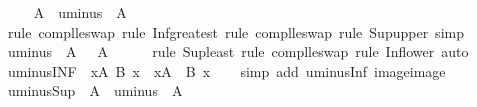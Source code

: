 \begin{isabellebody}
\ \ \isamarkupfalse%
\ {\isachardoublequoteopen}{\isacharminus}{\kern0pt}\ {\isasymSqinter}A\ {\isasymle}\ {\isasymSqunion}{\isacharparenleft}{\kern0pt}uminus\ {\isacharbackquote}{\kern0pt}\ A{\isacharparenright}{\kern0pt}{\isachardoublequoteclose}\isanewline
\ \ \ \ \isamarkupfalse%
\ {\isacharparenleft}{\kern0pt}rule\ compl{\isacharunderscore}{\kern0pt}le{\isacharunderscore}{\kern0pt}swap{}{\isacharcomma}{\kern0pt}\ rule\ Inf{\isacharunderscore}{\kern0pt}greatest{\isacharcomma}{\kern0pt}\ rule\ compl{\isacharunderscore}{\kern0pt}le{\isacharunderscore}{\kern0pt}swap{}{\isacharcomma}{\kern0pt}\ rule\ Sup{\isacharunderscore}{\kern0pt}upper{\isacharparenright}{\kern0pt}\ simp\isanewline
\ \ \isamarkupfalse%
\ {\isachardoublequoteopen}{\isasymSqunion}{\isacharparenleft}{\kern0pt}uminus\ {\isacharbackquote}{\kern0pt}\ A{\isacharparenright}{\kern0pt}\ {\isasymle}\ {\isacharminus}{\kern0pt}\ {\isasymSqinter}A{\isachardoublequoteclose}\isanewline
\ \ \ \ \isamarkupfalse%
\ {\isacharparenleft}{\kern0pt}rule\ Sup{\isacharunderscore}{\kern0pt}least{\isacharcomma}{\kern0pt}\ rule\ compl{\isacharunderscore}{\kern0pt}le{\isacharunderscore}{\kern0pt}swap{}{\isacharcomma}{\kern0pt}\ rule\ Inf{\isacharunderscore}{\kern0pt}lower{\isacharparenright}{\kern0pt}\ auto\isanewline
{}\isamarkupfalse%
%
\endisatagproof
{\isafoldproof}%
%
\isadelimproof
\isanewline
%
\endisadelimproof
\isanewline
{}\isamarkupfalse%
\ uminus{\isacharunderscore}{\kern0pt}INF{\isacharcolon}{\kern0pt}\ {\isachardoublequoteopen}{\isacharminus}{\kern0pt}\ {\isacharparenleft}{\kern0pt}{\isasymSqinter}x{\isasymin}A{\isachardot}{\kern0pt}\ B\ x{\isacharparenright}{\kern0pt}\ {\isacharequal}{\kern0pt}\ {\isacharparenleft}{\kern0pt}{\isasymSqunion}x{\isasymin}A{\isachardot}{\kern0pt}\ {\isacharminus}{\kern0pt}\ B\ x{\isacharparenright}{\kern0pt}{\isachardoublequoteclose}\isanewline
%
\isadelimproof
\ \ %
\endisadelimproof
%
\isatagproof
{}\isamarkupfalse%
\ {\isacharparenleft}{\kern0pt}simp\ add{\isacharcolon}{\kern0pt}\ uminus{\isacharunderscore}{\kern0pt}Inf\ image{\isacharunderscore}{\kern0pt}image{\isacharparenright}{\kern0pt}%
\endisatagproof
{\isafoldproof}%
%
\isadelimproof
\isanewline
%
\endisadelimproof
\isanewline
{}\isamarkupfalse%
\ uminus{\isacharunderscore}{\kern0pt}Sup{\isacharcolon}{\kern0pt}\ {\isachardoublequoteopen}{\isacharminus}{\kern0pt}\ {\isacharparenleft}{\kern0pt}{\isasymSqunion}A{\isacharparenright}{\kern0pt}\ {\isacharequal}{\kern0pt}\ {\isasymSqinter}{\isacharparenleft}{\kern0pt}uminus\ {\isacharbackquote}{\kern0pt}\ A{\isacharparenright}{\kern0pt}{\isachardoublequoteclose}\isanewline

\end{isabellebody}
